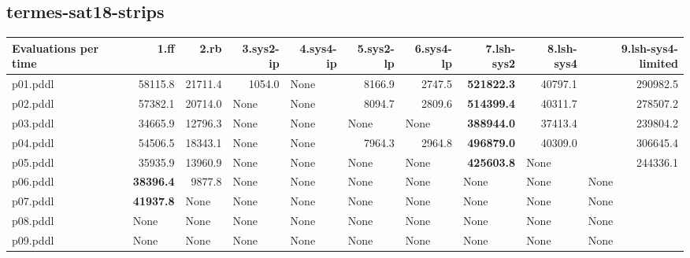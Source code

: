 \documentclass{article}
\begin{document}
\hypertarget{evaluations_per_time-termes-sat18-strips}{}
\subsection*{termes-sat18-strips}

\begin{tabular}{@{}lrrrrrrrrr@{}}
Evaluations per time & 1.ff & 2.rb & 3.sys2-ip & 4.sys4-ip & 5.sys2-lp & 6.sys4-lp & 7.lsh-sys2 & 8.lsh-sys4 & 9.lsh-sys4-limited \\
\midrule
p01.pddl & 58115.8 & 21711.4 & 1054.0 & \multicolumn{1}{|l|}{None} & 8166.9 & 2747.5 & \textbf{521822.3} & 40797.1 & 290982.5 \\
p02.pddl & 57382.1 & 20714.0 & \multicolumn{1}{|l|}{None} & \multicolumn{1}{|l|}{None} & 8094.7 & 2809.6 & \textbf{514399.4} & 40311.7 & 278507.2 \\
p03.pddl & 34665.9 & 12796.3 & \multicolumn{1}{|l|}{None} & \multicolumn{1}{|l|}{None} & \multicolumn{1}{|l|}{None} & \multicolumn{1}{|l|}{None} & \textbf{388944.0} & 37413.4 & 239804.2 \\
p04.pddl & 54506.5 & 18343.1 & \multicolumn{1}{|l|}{None} & \multicolumn{1}{|l|}{None} & 7964.3 & 2964.8 & \textbf{496879.0} & 40309.0 & 306645.4 \\
p05.pddl & 35935.9 & 13960.9 & \multicolumn{1}{|l|}{None} & \multicolumn{1}{|l|}{None} & \multicolumn{1}{|l|}{None} & \multicolumn{1}{|l|}{None} & \textbf{425603.8} & \multicolumn{1}{|l|}{None} & 244336.1 \\
p06.pddl & \textbf{38396.4} & 9877.8 & \multicolumn{1}{|l|}{None} & \multicolumn{1}{|l|}{None} & \multicolumn{1}{|l|}{None} & \multicolumn{1}{|l|}{None} & \multicolumn{1}{|l|}{None} & \multicolumn{1}{|l|}{None} & \multicolumn{1}{|l|}{None} \\
p07.pddl & \textbf{41937.8} & \multicolumn{1}{|l|}{None} & \multicolumn{1}{|l|}{None} & \multicolumn{1}{|l|}{None} & \multicolumn{1}{|l|}{None} & \multicolumn{1}{|l|}{None} & \multicolumn{1}{|l|}{None} & \multicolumn{1}{|l|}{None} & \multicolumn{1}{|l|}{None} \\
p08.pddl & \multicolumn{1}{|l|}{None} & \multicolumn{1}{|l|}{None} & \multicolumn{1}{|l|}{None} & \multicolumn{1}{|l|}{None} & \multicolumn{1}{|l|}{None} & \multicolumn{1}{|l|}{None} & \multicolumn{1}{|l|}{None} & \multicolumn{1}{|l|}{None} & \multicolumn{1}{|l|}{None} \\
p09.pddl & \multicolumn{1}{|l|}{None} & \multicolumn{1}{|l|}{None} & \multicolumn{1}{|l|}{None} & \multicolumn{1}{|l|}{None} & \multicolumn{1}{|l|}{None} & \multicolumn{1}{|l|}{None} & \multicolumn{1}{|l|}{None} & \multicolumn{1}{|l|}{None} & \multicolumn{1}{|l|}{None} \\

\end{tabular}
\end{document}

